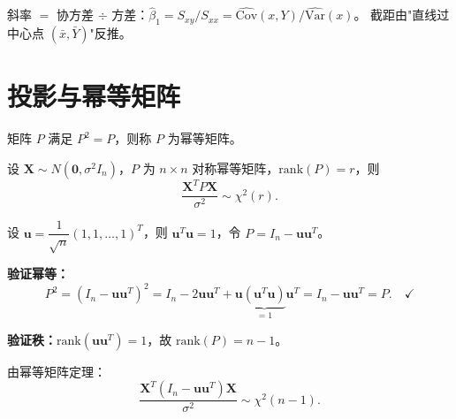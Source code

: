 \begin{dxtips}
斜率 $=$ 协方差 $\div$ 方差：$\hat\beta_1=S_{xy}/S_{xx}=\widehat{\mathrm{Cov}}(x,Y)/\widehat{\mathrm{Var}}(x)$。
截距由"直线过中心点 $(\bar x,\bar Y)$"反推。
\end{dxtips}
\section{投影与幂等矩阵}

\begin{definition}[幂等矩阵]
矩阵 $P$ 满足 $P^2 = P$，则称 $P$ 为幂等矩阵。
\end{definition}

\begin{theorem}
设 $\boldsymbol{X} \sim N(\boldsymbol{0}, \sigma^2 I_n)$，$P$ 为 $n\times n$ 对称幂等矩阵，$\mathrm{rank}(P)=r$，则
\[
\frac{\boldsymbol{X}^T P \boldsymbol{X}}{\sigma^2} \sim \chi^2(r).
\]
\end{theorem}

\begin{example}[投影定理：5.2.2]
设 $\boldsymbol{u} = \dfrac{1}{\sqrt{n}}(1,1,\ldots,1)^T$，则 $\boldsymbol{u}^T\boldsymbol{u}=1$，令 $P = I_n - \boldsymbol{u}\boldsymbol{u}^T$。

\textbf{验证幂等：}
\[
P^2 = (I_n-\boldsymbol{u}\boldsymbol{u}^T)^2 = I_n - 2\boldsymbol{u}\boldsymbol{u}^T + \boldsymbol{u}\underbrace{(\boldsymbol{u}^T\boldsymbol{u})}_{=1}\boldsymbol{u}^T = I_n - \boldsymbol{u}\boldsymbol{u}^T = P. \quad \checkmark
\]

\textbf{验证秩：}$\mathrm{rank}(\boldsymbol{u}\boldsymbol{u}^T)=1$，故 $\mathrm{rank}(P)=n-1$。

由幂等矩阵定理：
\[
\frac{\boldsymbol{X}^T(I_n-\boldsymbol{u}\boldsymbol{u}^T)\boldsymbol{X}}{\sigma^2} \sim \chi^2(n-1).
\]
\end{example}